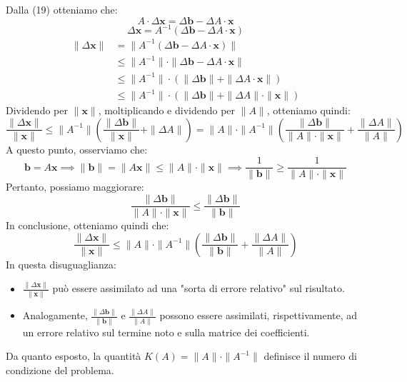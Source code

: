 Dalla (19) otteniamo che:
$$ A \cdot \Delta\mathbf{x} = \Delta\mathbf{b} - \Delta A \cdot \mathbf{x} $$
$$ \Delta\mathbf{x} = A^{-1}(\Delta\mathbf{b} - \Delta A \cdot \mathbf{x}) $$
\begin{align*}
    \| \Delta\mathbf{x} \| &= \| A^{-1}(\Delta\mathbf{b} - \Delta A \cdot \mathbf{x}) \| \\
    &\le \| A^{-1} \| \cdot \| \Delta\mathbf{b} - \Delta A \cdot \mathbf{x} \| \\
    &\le \| A^{-1} \| \cdot (\| \Delta\mathbf{b} \| + \| \Delta A \cdot \mathbf{x} \|) \\
    &\le \| A^{-1} \| \cdot (\| \Delta\mathbf{b} \| + \| \Delta A \| \cdot \| \mathbf{x} \|)
\end{align*}
Dividendo per $\| \mathbf{x} \|$, moltiplicando e dividendo per $\| A\|$, otteniamo quindi:
\begin{equation} \label{eq:stima_err1}
    \frac{\| \Delta\mathbf{x} \|}{\| \mathbf{x} \|} \le \| A^{-1} \| \left( \frac{\| \Delta\mathbf{b} \|}{\| \mathbf{x} \|} + \| \Delta A \| \right) = \| A \| \cdot \| A^{-1} \| \left( \frac{\| \Delta\mathbf{b} \|}{\| A \| \cdot \| \mathbf{x} \|} + \frac{\| \Delta A \|}{\| A \|} \right)
\end{equation}
A questo punto, osserviamo che:
$$ \mathbf{b} = A\mathbf{x} \implies \| \mathbf{b} \| = \| A\mathbf{x} \| \le \| A \| \cdot \| \mathbf{x} \| \implies \frac{1}{\| \mathbf{b} \|} \ge \frac{1}{\| A \| \cdot \| \mathbf{x} \|} $$
Pertanto, possiamo maggiorare:
$$ \frac{\| \Delta\mathbf{b} \|}{\| A \| \cdot \| \mathbf{x} \|} \le \frac{\| \Delta\mathbf{b} \|}{\| \mathbf{b} \|} $$
In conclusione, otteniamo quindi che:
\begin{equation} \label{eq:condizionamento}
    \frac{\| \Delta\mathbf{x} \|}{\| \mathbf{x} \|} \le \| A \| \cdot \| A^{-1} \| \left( \frac{\| \Delta\mathbf{b} \|}{\| \mathbf{b} \|} + \frac{\| \Delta A \|}{\| A \|} \right)
\end{equation}
In questa disuguaglianza:
\begin{itemize}
    \item $\frac{\| \Delta\mathbf{x} \|}{\| \mathbf{x} \|}$ può essere assimilato ad una "sorta di errore relativo" sul risultato.
    \item Analogamente, $\frac{\| \Delta\mathbf{b} \|}{\| \mathbf{b} \|}$ e $\frac{\| \Delta A \|}{\| A \|}$ possono essere assimilati, rispettivamente, ad un errore relativo sul termine noto e sulla matrice dei coefficienti.
\end{itemize}
Da quanto esposto, la quantità $K(A) = \| A \| \cdot \| A^{-1} \|$ definisce il numero di condizione del problema.

